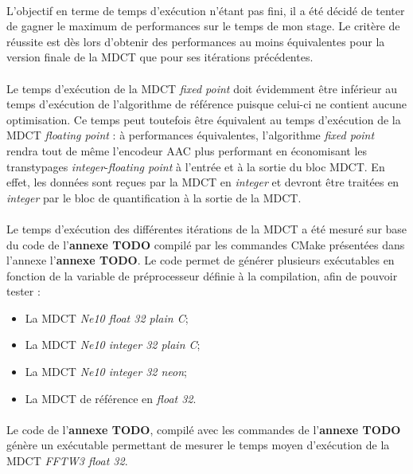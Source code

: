 \documentclass{article}
\begin{document}
    \paragraph{}
    L'objectif en terme de temps d'exécution n'étant pas fini, il a été décidé de tenter de gagner le maximum de performances sur le temps de mon stage. Le critère de réussite est dès lors d'obtenir des performances au moins équivalentes pour la version finale de la MDCT que pour ses itérations précédentes.

    \paragraph{}
    Le temps d'exécution de la MDCT \emph{fixed point} doit évidemment être inférieur au temps d'exécution de l'algorithme de référence puisque celui-ci ne contient aucune optimisation. Ce temps peut toutefois être équivalent au temps d'exécution de la MDCT \emph{floating point} : à performances équivalentes, l'algorithme \emph{fixed point} rendra tout de même l'encodeur AAC plus performant en économisant les transtypages \emph{integer}-\emph{floating point} à l'entrée et à la sortie du bloc MDCT. En effet, les données sont reçues par la MDCT en \emph{integer} et devront être traitées en \emph{integer} par le bloc de quantification à la sortie de la MDCT.

    \paragraph{}
    Le temps d'exécution des différentes itérations de la MDCT a été mesuré sur base du code de l'\textbf{annexe TODO} compilé par les commandes CMake présentées dans l'annexe l'\textbf{annexe TODO}. Le code permet de générer plusieurs exécutables en fonction de la variable de préprocesseur définie à la compilation, afin de pouvoir tester :
    \begin{itemize}
        \item La MDCT \emph{Ne10 float 32 plain C};
        \item La MDCT \emph{Ne10 integer 32 plain C};
        \item La MDCT \emph{Ne10 integer 32 neon};
        \item La MDCT de référence en \emph{float 32}.
    \end{itemize}

    \paragraph{}
    Le code de l'\textbf{annexe TODO}, compilé avec les commandes de l'\textbf{annexe TODO} génère un exécutable permettant de mesurer le temps moyen d'exécution de la MDCT \emph{FFTW3 float 32}.
    
\end{document}
